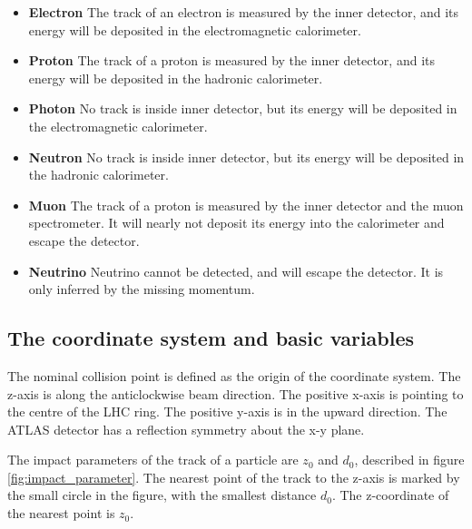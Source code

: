 \begin{itemize}
\item \textbf{Electron} The track of an electron is measured by the inner detector, and its energy will be deposited in the electromagnetic calorimeter.
\item \textbf{Proton} The track of a proton is measured by the inner detector, and its energy will be deposited in the hadronic calorimeter.
\item \textbf{Photon} No track is inside inner detector, but its energy will be deposited in the electromagnetic calorimeter.
\item \textbf{Neutron} No track is inside inner detector, but its energy will be deposited in the hadronic calorimeter.
\item \textbf{Muon} The track of a proton is measured by the inner detector and the muon spectrometer. It will nearly not deposit its energy into the calorimeter and escape the detector.
\item \textbf{Neutrino} Neutrino cannot be detected, and will escape the detector. It is only inferred by the missing momentum.
\end{itemize}

\subsection{The coordinate system and basic variables}
The nominal collision point is defined as the origin of the coordinate system.
The z-axis is along the anticlockwise beam direction.
The positive x-axis is pointing to the centre of the LHC ring.
The positive y-axis is in the upward direction.
The ATLAS detector has a reflection symmetry about the x-y plane.

The impact parameters of the track of a particle are $z_0$ and $d_0$, described in figure \ref{fig:impact_parameter}.
The nearest point of the track to the z-axis is marked by the small circle in the figure, with the smallest distance $d_0$.
The z-coordinate of the nearest point is $z_0$.

